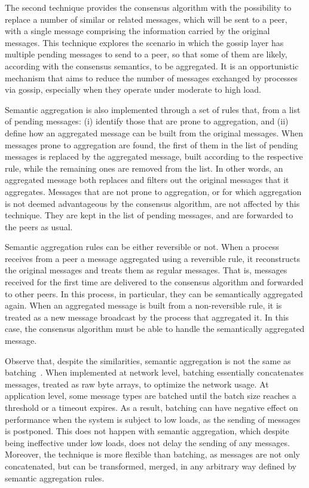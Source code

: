 The second technique provides the consensus algorithm with the possibility to
replace a number of similar or related messages, which will be sent to a peer,
with a single message comprising the information carried by the original
messages.
This technique explores the scenario in which the gossip layer has multiple
pending messages to send to a peer, so that some of them are likely, according
with the consensus semantics, to be aggregated.
It is an opportunistic mechanism that aims to reduce the number of messages
exchanged by processes via gossip, especially when they operate under moderate
to high load.

Semantic aggregation is also implemented through a set of rules that, from a
list of pending messages: (i) identify those that are prone to aggregation, and
(ii) define how an aggregated message can be built from the original messages.
When messages prone to aggregation are found, the first of them in the list of
pending messages is replaced by the aggregated message, built according to
the respective rule, while the remaining ones are removed from the list.
In other words, an aggregated message both replaces and filters out the
original messages that it aggregates.
Messages that are not prone to aggregation, or for which aggregation is not
deemed advantageous by the consensus algorithm, are not affected by this
technique.
They are kept in the list of pending messages, and are forwarded to the peers as
usual.

Semantic aggregation rules can be either reversible or not.
When a process receives from a peer a message aggregated using a reversible
rule, it reconstructs the original messages and treats them as regular messages.
That is, messages received for the first time are delivered to the
consensus algorithm and forwarded to other peers.
In this process, in
particular, they can be semantically aggregated again.
When an aggregated message is built from a non-reversible rule, it is treated
as a new message broadcast by the process that aggregated it.
In this case, the consensus algorithm must be able to handle the
semantically aggregated message.

Observe that, despite the similarities, semantic aggregation is not the same as
batching~\cite{FR95}.
When implemented at network level, batching essentially concatenates messages,
treated as raw byte arrays, to optimize the network usage.
At application level, some message types are batched until the batch size
reaches a threshold or a timeout expires.
As a result, batching can have negative effect on performance when the system
is subject to low loads, as the sending of messages is postponed.
This does not happen with semantic aggregation, which despite being ineffective
under low loads, does not delay the sending of any messages.
Moreover, the technique is more flexible than batching, as messages are not
only concatenated, but can be transformed, merged, in any arbitrary way defined
by semantic aggregation rules.

